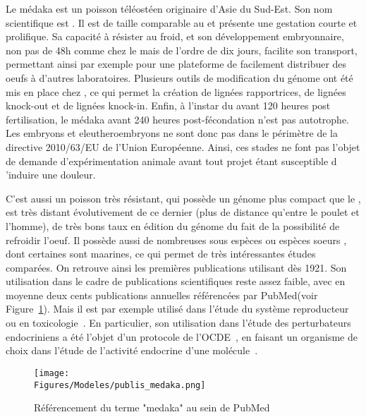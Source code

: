 \documentclass[\main/main.tex]{subfiles}
\begin{document}
%
Le médaka est un poisson téléostéen originaire d'Asie du Sud-Est.
%
Son nom scientifique est \oz{}.
%
Il est de taille comparable au \pz{} et présente une gestation courte et prolifique.
%
Sa capacité à résister au froid, et son développement embryonnaire, non pas de 48h comme chez le \pz{} mais de l'ordre de dix jours,  facilite son transport, permettant ainsi par exemple pour une plateforme de facilement distribuer des oeufs à d'autres laboratoires.
%
Plusieurs outils de modification du génome ont été mis en place chez \ol{}\cite{kirchmaier_2015, ansai_2017}, 
ce qui permet la création de lignées rapportrices, de lignées knock-out et de lignées knock-in\cite{abdelmoneim_2018,jin_2020,Watakabe_2018,qiu_2014,gay_2018}.
%
Enfin, à l'instar du \pz{} avant 120 heures post fertilisation,
le médaka avant 240 heures post-fécondation n'est pas autotrophe.
%
Les embryons et eleutheroembryons ne sont donc pas dans le périmètre de la directive 2010/63/EU de l'Union Européenne.
%
Ainsi, ces stades ne font pas l'objet de demande d'expérimentation animale avant tout projet étant susceptible d 'induire une douleur.

%
C'est aussi un poisson très résistant, qui possède un génome plus compact que le \pz{} , est très distant évolutivement de ce dernier (plus de distance qu'entre le poulet et l'homme), de très bons taux en édition du génome du fait de la possibilité de refroidir l'oeuf. Il possède aussi de nombreuses sous espèces ou espèces soeurs , dont certaines sont maarines, ce qui permet de très intéressantes études comparées.
%
On retrouve ainsi les premières publications utilisant \ol{} dès 1921\cite{aida_1921}.
%
Son utilisation dans le cadre de publications scientifiques reste assez faible, avec en moyenne deux cents publications annuelles référencées par PubMed(voir Figure~\ref{fig:model:oz:stats}).
%
Mais il est par exemple utilisé dans l'étude du système reproducteur~\cite{gay_2018,herberg_2018} ou
en toxicologie~\cite{carvan_2007,bertotto_2019,cleary_2019,powe_2018}.
%
En particulier, son utilisation dans l'étude des perturbateurs endocriniens a été l'objet d'un protocole de l'OCDE~\cite{oecd_2009}, en faisant un organisme de choix dans l'étude de l'activité endocrine d'une molécule~\cite{chen_2018,dang_2019,spirhanzlova_2016}.

\begin{figure}[htbp]{\textwidth} 
    \centering
       \centering \texttt{[image: \\Figures/Modeles/publis\_medaka.png]}
       \caption{
            \label{fig:model:oz:stats}Référencement du terme "medaka" au sein de PubMed
            }
\end{figure}
\end{document}

